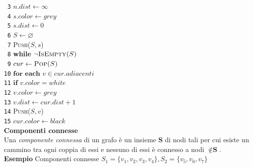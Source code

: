 \documentclass[10pt,landscape]{article}
\begin{document}
\begin{multicols*}{4}
                \verb| 3|\hspace*{1.5em} $n.dist \leftarrow \infty$\\
                \verb| 4|\hspace*{0.5em} $s.color \leftarrow grey$\\
                \verb| 5|\hspace*{0.5em} $s.dist \leftarrow 0$\\
                \verb| 6|\hspace*{0.5em} $S \leftarrow \varnothing$\\
                \verb| 7|\hspace*{0.5em} \textsc{Push($S,s$)}\\
                \verb| 8|\hspace*{0.5em} \textbf{while} $\lnot \textsc{IsEmpty($S$)}$\\
                \verb| 9|\hspace*{1.5em} $cur \leftarrow \textsc{Pop($S$)}$\\
                \verb|10|\hspace*{1.5em} $\textbf{for each } v \in cur.adiacenti$\\
                \verb|11|\hspace*{2.5em} $\textbf{if } v.color = white$\\
                \verb|12|\hspace*{3.5em} $v.color \leftarrow grey$\\
                \verb|13|\hspace*{3.5em} $v.dist \leftarrow cur.dist+1$\\
                \verb|14|\hspace*{3.5em} \textsc{Push($S,v$)}\\
                \verb|15|\hspace*{1.5em} $cur.color \leftarrow black$\\ [5pt]
                \textbf{Componenti connesse}\\ [3pt]
                Una \textit{componente connessa} di un grafo è un insieme $\textbf{S}$ di nodi tali per cui esiste
                un cammino tra ogni coppia di essi e nessuno di essi è connesso a nodi  $\notin \textbf{S}$.\\ [5pt]
                \textbf{Esempio} Componenti connesse $S_1 = \{v_1,v_2,v_3,v_4\}, S_2 = \{v_5,v_6,v_7\}$ \\ [3pt]
                \begin{center}
                        \begin{tikzpicture}[->, >=stealth', node distance=1.5cm, on grid, auto]

\end{tikzpicture}
\end{center}
\end{multicols*}
\end{document}
